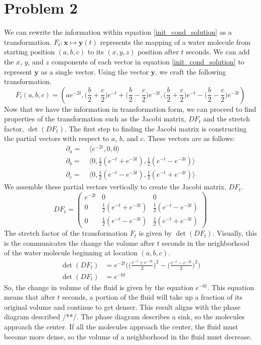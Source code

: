 \documentclass[a4paper]{article}
\newcommand{\myvec}[1]{\langle#1\rangle}
\begin{document}
\section{Problem 2}
We can rewrite the information within equation \ref{init_cond_solution} as a transformation. $F_t: \mathbf{x} \mapsto \mathbf{y}(t)$ represents the mapping of a water molecule from starting position $(a,b,c)$ to its  $(x,y,z)$ position after $t$ seconds. We can add the $x$, $y$, and $z$ components of each vector in equation \ref{init_cond_solution} to represent $\mathbf{y}$ as a single vector. Using the vector $\mathbf{y}$, we craft the following transformation.
\begin{equation}
	F_t(a,b,c) = (ae^{-2t}, \bigg(\frac{b}{2}+\frac{c}{2}\bigg)e^{-t}+\bigg(\frac{b}{2}-\frac{c}{2}\bigg)e^{-3t}, 
	\bigg(\frac{b}{2}+\frac{c}{2}\bigg)e^{-t}-\bigg(\frac{b}{2}-\frac{c}{2}\bigg)e^{-3t})
	\label{transformation1}
\end{equation}
Now that we have the information in transformation form, we can proceed to find properties of the transformation such as the Jacobi matrix, $DF_t$ and the stretch factor, $\det(DF_t)$. The first step to finding the Jacobi matrix is constructing the partial vectors with respect to $a$, $b$, and $c$. These vectors are as follows:
\begin{align*}
	\partial_a =&\ \myvec{e^{-2t}, 0, 0} \\
	\partial_b =&\ \myvec{0, \frac{1}{2}(e^{-t}+e^{-3t}), \frac{1}{2}(e^{-t}-e^{-3t})} \\
	\partial_c =&\ \myvec{0, \frac{1}{2}(e^{-t}-e^{-3t}), \frac{1}{2}(e^{-t}+e^{-3t})}
\end{align*}
We assemble these partial vectors vertically to create the Jacobi matrix, $DF_t$.
\begin{equation*}
	DF_t = \begin{pmatrix} e^{-2t} & 0 & 0	\\
	0 & \frac{1}{2}(e^{-t}+e^{-3t}) & \frac{1}{2}(e^{-t}-e^{-3t}) \\[1ex]
	0 & \frac{1}{2}(e^{-t}-e^{-3t}) & \frac{1}{2}(e^{-t}+e^{-3t}) \end{pmatrix}
\end{equation*}
The stretch factor of the transformation $F_t$ is given by $\det(DF_t)$. Visually, this is the communicates the change the volume after $t$ seconds in the neighborhood of the water molecule beginning at location $(a,b,c)$.
\begin{align}
	\det(DF_t) &= e^{-2t}\bigg(\Big(\frac{e^{-t}+e^{-3t}}{2}\Big)^2-\Big(\frac{e^{-t}-e^{-3t}}{2}\Big)^2\bigg) \nonumber\\
\det(DF_t) &= e^{-6t}
\label{stretch_Ft}
\end{align}
So, the change in volume of the fluid is given by the equation $e^{-6t}$. This equation means that after $t$ seconds, a portion of the fluid will take up a fraction of its original volume and continue to get denser. This result aligns with the phase diagram described /**/. The phase diagram describes a sink, so the molecules approach the center. If all the molecules approach the center, the fluid must become more dense, so the volume of a neighborhood in the fluid must decrease.
\end{document}
